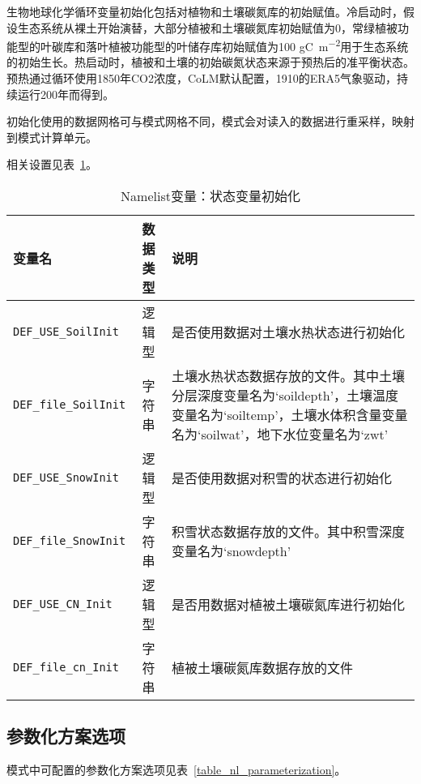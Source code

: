 生物地球化学循环变量初始化包括对植物和土壤碳氮库的初始赋值。冷启动时，假设生态系统从裸土开始演替，大部分植被和土壤碳氮库初始赋值为0，常绿植被功能型的叶碳库和落叶植被功能型的叶储存库初始赋值为100  \unit{gC.m^{-2}}用于生态系统的初始生长。热启动时，植被和土壤的初始碳氮状态来源于预热后的准平衡状态。预热通过循环使用1850年CO2浓度，CoLM默认配置，1910的ERA5气象驱动，持续运行200年而得到。

初始化使用的数据网格可与模式网格不同，模式会对读入的数据进行重采样，映射到模式计算单元。

相关设置见表~\ref{table_nl_ini}。

\begin{table}[!htbp] \small
\caption{Namelist变量：状态变量初始化}
\label{table_nl_ini}
\centering \renewcommand{\arraystretch}{1.5}
\begin{tabular}{lcp{}}
\toprule
\textbf{变量名} & \textbf{数据类型} & \textbf{说明} \\\midrule
\texttt{DEF\_USE\_SoilInit} & 逻辑型 & 是否使用数据对土壤水热状态进行初始化 \\
\texttt{DEF\_file\_SoilInit} & 字符串 & 土壤水热状态数据存放的文件。其中土壤分层深度变量名为`soildepth'，土壤温度变量名为`soiltemp'，土壤水体积含量变量名为`soilwat'，地下水位变量名为`zwt' \\
\texttt{DEF\_USE\_SnowInit} & 逻辑型 & 是否使用数据对积雪的状态进行初始化 \\
\texttt{DEF\_file\_SnowInit} & 字符串 & 积雪状态数据存放的文件。其中积雪深度变量名为`snowdepth' \\
\texttt{DEF\_USE\_CN\_Init} & 逻辑型 & 是否用数据对植被土壤碳氮库进行初始化 \\
\texttt{DEF\_file\_cn\_Init} & 字符串 & 植被土壤碳氮库数据存放的文件 \\
\bottomrule
\end{tabular}
\end{table}

\clearpage

\subsection{参数化方案选项}

模式中可配置的参数化方案选项见表~\ref{table_nl_parameterization}。

